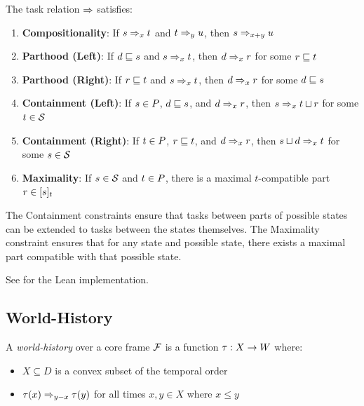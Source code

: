 \documentclass[../LogosReference.tex]{subfiles}
\begin{document}
\begin{definition}\label{def:task-constraints}
	The task relation $\Rightarrow$ satisfies:

	\begin{enumerate}
		\item \textbf{Compositionality}: If $s \Rightarrow_{x} t$ and $t \Rightarrow_{y} u$, then $s \Rightarrow_{x+y} u$
		\item \textbf{Parthood (Left)}: If $d \sqsubseteq s$ and $s \Rightarrow_{x} t$, then $d \Rightarrow_{x} r$ for some $r \sqsubseteq t$
		\item \textbf{Parthood (Right)}: If $r \sqsubseteq t$ and $s \Rightarrow_{x} t$, then $d \Rightarrow_{x} r$ for some $d \sqsubseteq s$
		\item \textbf{Containment (Left)}: If $s \in P$, $d \sqsubseteq s$, and $d \Rightarrow_{x} r$, then $s \Rightarrow_{x} t\sqcup r$ for some $t \in \mathcal{S}$
		\item \textbf{Containment (Right)}: If $t \in P$, $r \sqsubseteq t$, and $d \Rightarrow_{x} r$, then $s\sqcup d \Rightarrow_{x} t$ for some $s \in \mathcal{S}$
		\item \textbf{Maximality}: If $s \in \mathcal{S}$ and $t \in P$, there is a maximal $t$-compatible part $r \in [s]_{t}$
	\end{enumerate}
\end{definition}

\begin{remark}
	The Containment constraints ensure that tasks between parts of possible states can be extended to tasks between the states themselves.
	The Maximality constraint ensures that for any state and possible state, there exists a maximal part compatible with that possible state.
\end{remark}

See  for the Lean implementation.


\subsection{World-History}\label{sec:world-history}

\begin{definition}\label{def:world-history}
	A \emph{world-history} over a core frame $\mathcal{F}$ is a function $\tau : X \to W$ where:
	\begin{itemize}
		\item $X \subseteq D$ is a convex subset of the temporal order
		\item $\tau(x) \Rightarrow_{y-x} \tau(y)$ for all times $x, y \in X$ where $x \leq y$
	\end{itemize}
\end{definition}
\end{document}
